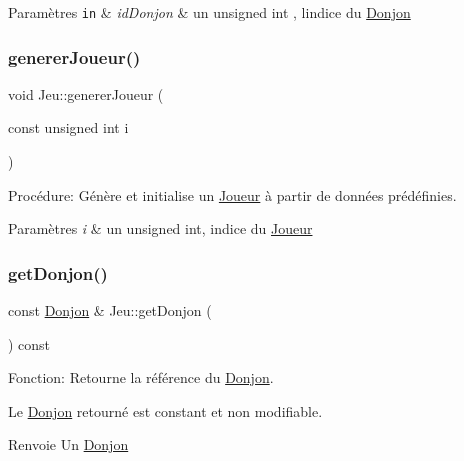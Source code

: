 \begin{DoxyParams}[1]{Paramètres}
\mbox{\tt in}  & {\em id\+Donjon} & un unsigned int , l\textquotesingle{}indice du \mbox{\hyperlink{classDonjon}{Donjon}} \\
\hline
\end{DoxyParams}
\mbox{\label{classJeu_ac4a466b8908c8ef5b308bbf27296322b}} 
\subsubsection{\texorpdfstring{generer\+Joueur()}{genererJoueur()}}
{\footnotesize\ttfamily void Jeu\+::generer\+Joueur (\begin{DoxyParamCaption}\item[{const unsigned int}]{i }\end{DoxyParamCaption})}



Procédure\+: Génère et initialise un \mbox{\hyperlink{classJoueur}{Joueur}} à partir de données prédéfinies. 


\begin{DoxyParams}{Paramètres}
{\em i} & un unsigned int, indice du \mbox{\hyperlink{classJoueur}{Joueur}} \\
\hline
\end{DoxyParams}
\mbox{\label{classJeu_ada75af8e4be937853af9c56dc087b337}} 
\subsubsection{\texorpdfstring{get\+Donjon()}{getDonjon()}}
{\footnotesize\ttfamily const \mbox{\hyperlink{classDonjon}{Donjon}} \& Jeu\+::get\+Donjon (\begin{DoxyParamCaption}{ }\end{DoxyParamCaption}) const}



Fonction\+: Retourne la référence du \mbox{\hyperlink{classDonjon}{Donjon}}. 

Le \mbox{\hyperlink{classDonjon}{Donjon}} retourné est constant et non modifiable. \begin{DoxyReturn}{Renvoie}
Un \mbox{\hyperlink{classDonjon}{Donjon}} 
\end{DoxyReturn}
\mbox{\label{classJeu_a439365f38115af1b3cfcd1cb1c3fa6ce}} 
